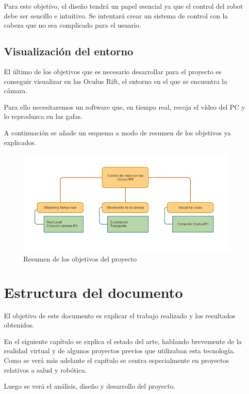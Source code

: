 \documentclass[twoside, 12pt]{epstfg}
\begin{document}
Para este objetivo, el diseño tendrá un papel esencial ya que el control del robot debe ser sencillo e intuitivo. Se intentará crear un sistema de control con la cabeza que no sea complicado para el usuario.

\subsection{Visualización del entorno}
El último de los objetivos que es necesario desarrollar para el proyecto es conseguir visualizar en las Oculus Rift, el entorno en el que se encuentra la cámara.

Para ello necesitaremos un software que, en tiempo real, recoja el vídeo del PC y lo reproduzca en las gafas. 


A continuación se añade un esquema a modo de resumen de los objetivos ya explicados.

\begin{figure}[h!]
	\centerline{
		\mbox{\includegraphics[width=7.00in]{images/objetivos.png}}
	}
	\caption{Resumen de los objetivos del proyecto}
\end{figure}

\newpage
\section{Estructura del documento}


El objetivo de este documento es explicar el trabajo realizado y los resultados obtenidos.

En el siguiente capítulo se explica el estado del arte, hablando brevemente de la realidad virtual y de algunos proyectos previos que utilizaban esta tecnología. Como se verá más adelante el capítulo se centra especialmente en proyectos relativos a salud y robótica.

Luego se verá el análisis, diseño y desarrollo del proyecto.
\end{document}
